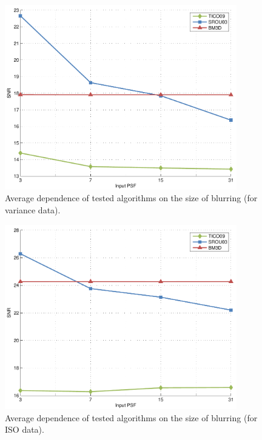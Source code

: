 \documentclass[12pt,notitlepage]{report}
\begin{document}
\begin{figure}[htb]
 \centering
  \includegraphics[width=0.9\textwidth]{avg_methods_vs_var_psf_size.pdf}
 \caption{Average dependence of tested algorithms on the size of blurring (for variance data).}
 \label{fig:avg_methods_vs_psf_size}
\end{figure}

\begin{figure}[htb]
 \centering
  \includegraphics[width=0.9\textwidth]{avg_methods_vs_ISO_psf_size.pdf}
 \caption{Average dependence of tested algorithms on the size of blurring (for ISO data).}
 \label{fig:avg_methods_vs_ISO_psf_size}
\end{figure}
\end{document}
